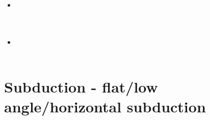 \begin{scriptsize}
\begin{itemize}
\textcite{kndc21} \\ 
\textcite{roac21} \\
\textcite{vasg21} \\
\textcite{basg21} \\
\textcite{zhwa21} \\
\textcite{zhzl21} \\
\textcite{auwy21} \\
\textcite{laar21} \\
\item[\twothousandtwentytwo] 
\textcite{zhli22} \\
\textcite{auyd22} \\
\textcite{alrr22a} 
\textcite{shgv22} \\
\item[\twothousandtwentythree] 
\textcite{wulq23} \\
\textcite{zhli23} \\
\end{itemize}
\end{scriptsize}

\section{Subduction - flat/low angle/horizontal subduction}

